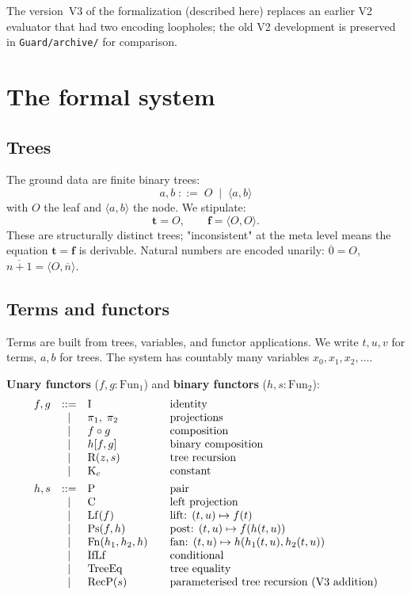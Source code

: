 \documentclass[11pt]{article}
\newcommand{\pair}[2]{\langle #1, #2 \rangle}
\newcommand{\trueT}{\mathbf{t}}
\newcommand{\falseT}{\mathbf{f}}
\newcommand{\nat}[1]{\overline{#1}}
\newcommand{\RecP}{\mathrm{RecP}}
\newcommand{\TreeEq}{\mathrm{TreeEq}}
\newcommand{\IfLf}{\mathrm{IfLf}}
\begin{document}
The version~V3 of the formalization (described here) replaces an
earlier V2 evaluator that had two encoding loopholes; the old V2
development is preserved in \verb|Guard/archive/| for comparison.

\section{The formal system}
\label{sec:system}

\subsection{Trees}

The ground data are finite binary trees:
\[
  a, b \;::=\; O \;\mid\; \pair{a}{b}
\]
with $O$ the leaf and $\pair{a}{b}$ the node.  We stipulate:
\[
  \trueT = O, \qquad \falseT = \pair{O}{O}.
\]
These are structurally distinct trees; "inconsistent" at the meta
level means the equation $\trueT = \falseT$ is derivable.  Natural
numbers are encoded unarily: $\nat{0} = O$, $\nat{n+1} = \pair{O}{\nat{n}}$.

\subsection{Terms and functors}

Terms are built from trees, variables, and functor applications.
We write $t, u, v$ for terms, $a, b$ for trees.  The system has
countably many variables $x_0, x_1, x_2, \ldots$.

\textbf{Unary functors} ($f, g : \mathrm{Fun}_1$) and
\textbf{binary functors} ($h, s : \mathrm{Fun}_2$):
\[
\begin{array}{rcl@{\qquad}l}
  f, g &::=& \mathrm{I} & \text{identity} \\
       &\mid& \pi_1,\; \pi_2 & \text{projections} \\
       &\mid& f \circ g & \text{composition} \\
       &\mid& h[f, g] & \text{binary composition} \\
       &\mid& \mathrm{R}(z, s) & \text{tree recursion} \\
       &\mid& \mathrm{K}_c & \text{constant} \\[4pt]
  h, s &::=& \mathrm{P} & \text{pair} \\
    &\mid& \mathrm{C} & \text{left projection} \\
    &\mid& \mathrm{Lf}(f) & \text{lift: } (t,u) \mapsto f(t) \\
    &\mid& \mathrm{Ps}(f, h) & \text{post: } (t,u) \mapsto f(h(t,u)) \\
    &\mid& \mathrm{Fn}(h_1,h_2,h) & \text{fan: } (t,u) \mapsto h(h_1(t,u), h_2(t,u)) \\
    &\mid& \IfLf & \text{conditional} \\
    &\mid& \TreeEq & \text{tree equality} \\
    &\mid& \RecP(s) & \text{parameterised tree recursion (V3 addition)}
\end{array}
\]
\end{document}
